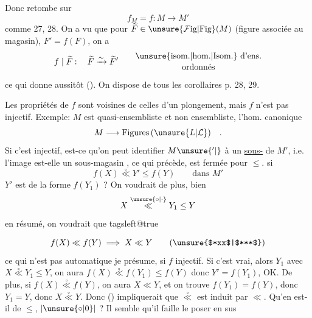 
Donc   retombe sur
\[
 f_M=f\mathbin{:}M\longrightarrow M'
\]
comme  27, 28. On a vu  que pour  $\widetilde F\in\unsure{\mathcal{F}\mathrm{ig}|\mathrm{Fig}}(M)$ (figure associée au magasin),  $F'=f(F)$, on a
\[
 f\mid\widetilde F\mathbin{:}\quad \widetilde F\xrightarrow{\sim}\widetilde F'
 \qquad\begin{gathered}\text{\unsure{isom.|hom.|Isom.} d'ens.}\\[-2pt]\text{ordonnés}\end{gathered}
\]
ce qui donne aussitôt (). On dispose   de tous les corollaires  p. 28, 29.

Les propriétés de $f$ sont voisines de celles d'un plongement, mais  $f$ n'est  pas  injectif. Exemple:  $M$ est quasi-ensembliste et non ensembliste, l'hom. canonique
\[
 M\longrightarrow\mathrm{Figures}\,(\unsure{L|\mathcal L})\quad .
\]
Si c'est injectif, est-ce qu'on peut identifier $M{\unsure{{}'|\vphantom{'}}}$ à un \uline{sous-} de $M'$, i.e. l'image est-elle un sous-magasin ,   ce qui précède,   est fermée pour $\leq$.   si
\[
 f(X)\mathrel{\overset{\circ}{\ll}}Y'\leq f(Y)\qquad\text{dans }M'
\]
 $Y'$ est de la forme $f(Y_1)$ ? On voudrait de plus, bien 
\[
 X\mathrel{\overset{\unsure{\circ|\cdot}}{\ll}}Y_1\leq Y
\]
en résumé, on voudrait que
\begingroup\csname tagsleft@true\endcsname

\[
 f(X)\ll f(Y)\implies X\ll Y \tag*{(\unsure{$*xx$|$***$})}
\]
ce qui n'est pas automatique je présume,  si $f$ injectif. Si c'est vrai, alors  $Y_1$ avec $X\mathrel{\overset{\circ}{\ll}}Y_1\leq Y$, on aura $f(X)\mathrel{\overset{\circ}{\ll}}f(Y_1)\leq f(Y)$ donc $Y'=f(Y_1)$, OK. De plus, si $f(X)\mathrel{\overset{\circ}{\ll}}f(Y)$, on aura $X\ll Y$, et   on trouve $f(Y_1)=f(Y)$, donc $Y_1=Y$, donc $X\mathrel{\overset{\circ}{\ll}}Y$. Donc () impliquerait que $\mathrel{\overset{\circ}{\ll}}$ est induit par $\ll$. Qu'en est-il de $\leq$, $|\unsure{\circ|0}|$ ? Il semble qu'il faille le poser en sus

